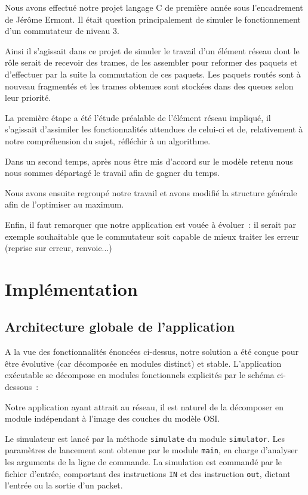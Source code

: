 \documentclass[a4paper,11pt]{article}
\begin{document}
Nous avons effectué notre projet langage C de première année sous l'encadrement de Jérôme Ermont. Il était question principalement de simuler le fonctionnement d'un commutateur de niveau 3. 

Ainsi il s'agissait dans ce projet de simuler le travail d'un élément réseau dont le rôle serait de recevoir des trames, de les assembler pour reformer des paquets et d'effectuer par la suite la commutation de ces paquets. Les paquets routés sont à nouveau fragmentés et les trames obtenues sont stockées dans des queues selon leur priorité.

La première étape a été l'étude préalable de l'élément réseau impliqué, il s'agissait d'assimiler les fonctionnalités attendues de celui-ci et de, relativement à notre compréhension du sujet, réfléchir à un algorithme.

Dans un second temps, après nous être mis d'accord sur le modèle retenu nous nous sommes départagé le travail afin de gagner du temps.  

Nous avons ensuite regroupé notre travail et avons modifié la structure générale afin de l'optimiser au maximum. 

Enfin, il faut remarquer que notre application est vouée à évoluer : il serait par exemple souhaitable que le commutateur soit capable de mieux traiter les erreur (reprise sur erreur, renvoie...)

\section{Implémentation}
\subsection{Architecture globale de l'application}

A la vue des fonctionnalités énoncées ci-dessus, notre solution a été conçue pour être évolutive (car décomposée en modules distinct) et stable. L'application exécutable se décompose en modules fonctionnels explicités par le schéma ci-dessous :

Notre application ayant attrait au réseau, il est naturel de la décomposer en module indépendant à l'image des couches du modèle OSI.

Le simulateur est lancé par la méthode \texttt{simulate} du module \texttt{simulator}. Les paramètres de lancement sont obtenue par le module \texttt{main}, en charge d'analyser les arguments de la ligne de commande. La simulation est commandé par le fichier d'entrée, comportant des instructions \texttt{IN} et des instruction \texttt{out}, dictant l'entrée ou la sortie d'un packet.
\end{document}
